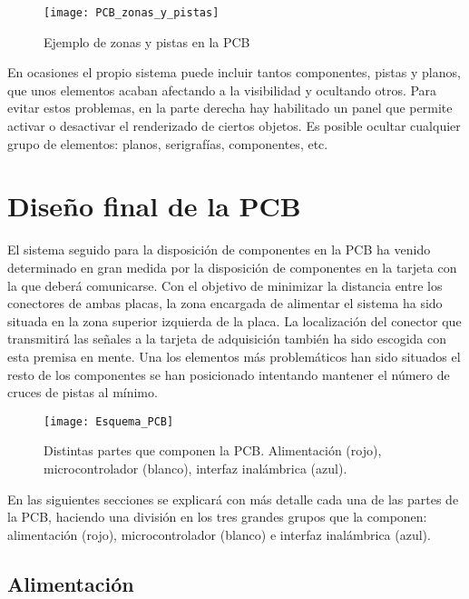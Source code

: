 \begin{figure} [H]
    \centering
    \texttt{[image: PCB\_zonas\_y\_pistas]}
    \caption{Ejemplo de zonas y pistas en la PCB}
    \label{fig:PCB_zonas_y_pistas}
\end{figure}

En ocasiones el propio sistema puede incluir tantos componentes, pistas y planos, que unos elementos acaban afectando a la visibilidad y ocultando otros. Para evitar estos problemas, en la parte derecha hay habilitado un panel que permite activar o desactivar el renderizado de ciertos objetos. Es posible ocultar cualquier grupo de elementos: planos, serigrafías, componentes, etc.
 
\clearpage 
 
\section{Diseño final de la PCB\label{sec:PCB_final}}

El sistema seguido para la disposición de componentes en la PCB ha venido determinado en gran medida por la disposición de componentes en la tarjeta con la que deberá comunicarse. Con el objetivo de minimizar la distancia entre los conectores de ambas placas, la zona encargada de alimentar el sistema ha sido situada en la zona superior izquierda de la placa. La localización del conector que transmitirá las señales a la tarjeta de adquisición también ha sido escogida con esta premisa en mente. Una los elementos más problemáticos han sido situados el resto de los componentes se han posicionado intentando mantener el número de cruces de pistas al mínimo.

\begin{figure} [H]
    \centering
    \texttt{[image: Esquema\_PCB]}
    \caption{Distintas partes que componen la PCB. Alimentación (rojo), microcontrolador (blanco), interfaz inalámbrica (azul).}
    \label{fig:Esquema_PCB}
\end{figure}

En las siguientes secciones se explicará con más detalle cada una de las partes de la PCB, haciendo una división en los tres grandes grupos que la componen: alimentación (rojo), microcontrolador (blanco) e interfaz inalámbrica (azul).

\subsection{Alimentación\label{sec:PCB_alimentacion}}

